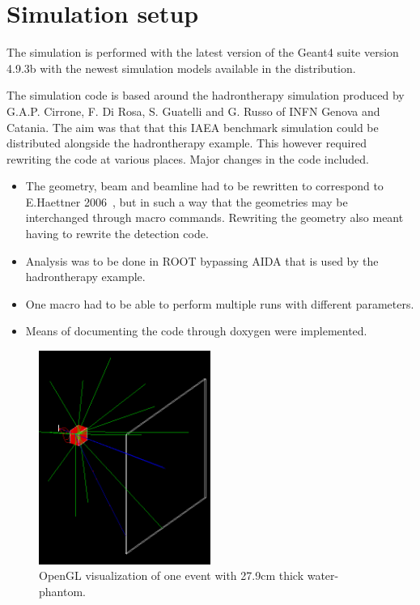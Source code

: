 \section{Simulation setup} %
The simulation is performed with the latest version of the Geant4 suite version 4.9.3b with the newest simulation models available in the distribution.

The simulation code is based around the hadrontherapy simulation produced by G.A.P. Cirrone, F. Di Rosa, S. Guatelli and  G. Russo of INFN Genova and Catania. The aim was that that this IAEA benchmark simulation could be distributed alongside the hadrontherapy example. This however required rewriting the code at various places. Major changes in the code included.
\begin{itemize}
\item The geometry, beam and beamline had to be rewritten to correspond to E.Haettner 2006~\cite{ehaettner}, but in such a way that the geometries may be interchanged through macro commands. Rewriting the geometry also meant having to rewrite the detection code.
\item Analysis was to be done in ROOT bypassing AIDA that is used by the hadrontherapy example.
\item One macro had to be able to perform multiple runs with different parameters.
\item Means of documenting the code through doxygen were implemented.
\end{itemize}


\begin{figure}[h] 
\begin{center}
\includegraphics[width=0.5\textwidth]{images/oneEvent.png}  
\caption{\label{fig:oneEvent} OpenGL visualization of one event with 27.9cm thick water-phantom.}
\end{center}
\end{figure}

